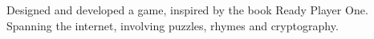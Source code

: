 \documentclass[]{font}
\begin{document}
\begin{minipage}[t]{0.66\textwidth}
Designed and developed a game, inspired by the book Ready Player One. Spanning the internet, involving puzzles, rhymes and cryptography.
\sectionsep



\end{minipage} 
\end{document}
